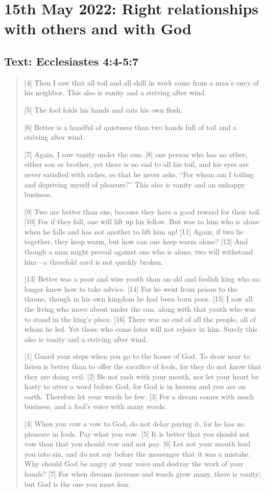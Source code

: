 \section{15th May 2022: Right relationships with others and with God}
\subsection*{Text: Ecclesiastes 4:4-5:7}
  \begin{quote}
    [4] Then I saw that all toil and all skill in work come from a man’s envy
    of his neighbor.  This also is vanity and a striving after wind.

    [5] The fool folds his hands and eats his own flesh.

    [6] Better is a handful of quietness than two hands full of toil and a striving after wind.

    [7] Again, I saw vanity under the sun: [8] one person who has no other,
    either son or brother, yet there is no end to all his toil, and his eyes
    are never satisfied with riches, so that he never asks, “For whom am I
    toiling and depriving myself of pleasure?” This also is vanity and an
    unhappy business.

    [9] Two are better than one, because they have a good reward for their
    toil.  [10] For if they fall, one will lift up his fellow.  But woe to
    him who is alone when he falls and has not another to lift him up!  [11]
    Again, if two lie together, they keep warm, but how can one keep warm
    alone?  [12] And though a man might prevail against one who is alone, two
    will withstand him—a threefold cord is not quickly broken.

    [13] Better was a poor and wise youth than an old and foolish king who no
    longer knew how to take advice.  [14] For he went from prison to the
    throne, though in his own kingdom he had been born poor.  [15] I saw all
    the living who move about under the sun, along with that youth who was to
    stand in the king’s place.  [16] There was no end of all the people, all
    of whom he led.  Yet those who come later will not rejoice in him.
    Surely this also is vanity and a striving after wind.

    [1] Guard your steps when you go to the house of God.  To draw near to
    listen is better than to offer the sacrifice of fools, for they do not
    know that they are doing evil.  [2] Be not rash with your mouth, nor let
    your heart be hasty to utter a word before God, for God is in heaven and
    you are on earth.  Therefore let your words be few.  [3] For a dream
    comes with much business, and a fool’s voice with many words.

    [4] When you vow a vow to God, do not delay paying it, for he has no
    pleasure in fools.  Pay what you vow.  [5] It is better that you should
    not vow than that you should vow and not pay.  [6] Let not your mouth
    lead you into sin, and do not say before the messenger that it was a
    mistake.  Why should God be angry at your voice and destroy the work of
    your hands?  [7] For when dreams increase and words grow many, there is
    vanity; but God is the one you must fear.
  \end{quote}
